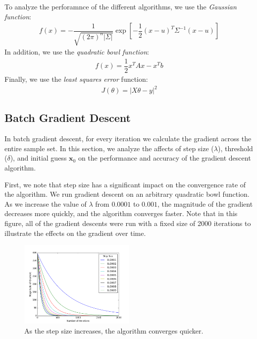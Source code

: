 \documentclass{paper}
\begin{document}
To analyze the perforamnce of the different algorithms, we use the \emph{Gaussian function}:
\begin{align*}
f(x) = - \dfrac{1}{\sqrt{(2\pi)^n |\Sigma|}} \exp \left[-\dfrac{1}{2} (x - u)^T \Sigma^{-1} (x-u)\right]
\end{align*}
In addition, we use the \emph{quadratic bowl function}:
\begin{align*}
f(x) = \dfrac{1}{2} x^T A x - x^T b 
\end{align*}
Finally, we use the \emph{least squares error} function:
\begin{align*}
J(\theta) = |X\theta - y|^2
\end{align*}


\subsection{Batch Gradient Descent}

In batch gradient descent, for every iteration we calculate the gradient across the entire sample set. In this section, we analyze the affects of step size ($\lambda$), threshold ($\delta$), and initial guess $\mathbf{x}_{0}$ on the performance and accuracy of the gradient descent algorithm. 

First, we note that step size has a significant impact on the convergence rate of the algorithm. We run gradient descent on an arbitrary quadratic bowl function. As we increase the value of $\lambda$ from $0.0001$ to $0.001$, the magnitude of the gradient decreases more quickly, and the algorithm converges faster. Note that in this figure, all of the gradient descents were run with a fixed size of 2000 iterations to illustrate the effects on the gradient over time.

\begin{figure}[ht!]
  \centering
    \includegraphics[width=0.5\textwidth]{../images/quadratic_steps_vs_mag}
  \caption{As the step size increases, the algorithm converges quicker.}
\end{figure}
\end{document}

